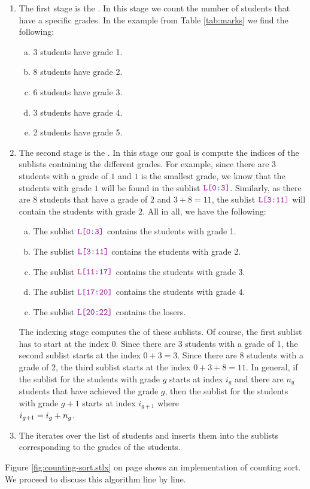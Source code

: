 \begin{enumerate}
\item The first stage is the .  In this stage we count the number of students
      that have a specific grades.  In the example from Table \ref{tab:marks} we find the following:
      \begin{enumerate}[(a)]
      \item 3 students have grade 1.
      \item 8 students have grade 2.
      \item 6 students have grade 3.
      \item 3 students have grade 4.
      \item 2 students have grade 5.
      \end{enumerate}
\item The second stage is the .  In this stage our goal is compute the indices of the
      sublists containing the different grades.  For example, since there are 3 students with a grade of $1$
      and $1$ is the smallest grade, we know that the students with grade $1$ will be found in the sublist
      $\mytt{L[0:3]}$.  Similarly, as there are $8$ students that have a grade of $2$ and $3 + 8 = 11$,
      the sublist $\mytt{L[3:11]}$ will contain the students with grade $2$.
      All in all, we have the following:
      \begin{enumerate}[(a)]
      \item The sublist $\mytt{L[0:3]}$ contains the students with grade 1.
      \item The sublist $\mytt{L[3:11]}$ contains the students with grade 2.
      \item The sublist $\mytt{L[11:17]}$ contains the students with grade 3.
      \item The sublist $\mytt{L[17:20]}$ contains the students with grade 4.
      \item The sublist $\mytt{L[20:22]}$ contains the losers.
      \end{enumerate}
      The indexing stage computes the  of these sublists.
      Of course,  the first sublist has to start at the index $0$.  Since there are 3 students with a grade of 1,
      the second sublist starts at the index $0 + 3 = 3$.  Since there are 8 students with a grade of 2, the third
      sublist starts at the index $0 + 3 + 8 = 11$.  In general, if the sublist for the students with grade $g$
      starts at index $i_g$ and there are $n_g$ students that have achieved the grade $g$, then the sublist for the
      students with grade $g+1$ starts at index $i_{g+1}$ where
      \\[0.2cm]
      \hspace*{1.3cm}
      $\displaystyle i_{g+1} = i_g + n_g$.
\item The  iterates over the list of students and inserts them into the sublists
      corresponding to the grades of the students.
\end{enumerate}
Figure \ref{fig:counting-sort.stlx} on page \pageref{fig:counting-sort.stlx} shows an implementation of
counting sort.  We proceed to discuss this algorithm line by line.

